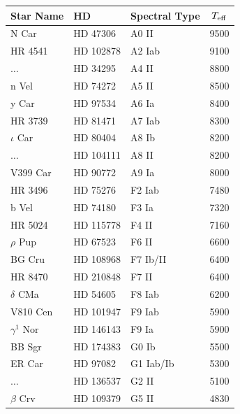 \begin{table}
\begin{center}
\begin{tabular}{lllc}
\hline
Star Name & HD & Spectral Type & $T_{\rm eff}$\\
\hline
\hline
N Car          & HD 47306    &    A0      II &         9500\\
HR 4541        & HD 102878   &    A2     Iab &         9100\\
$\dots$        & HD 34295    &    A4      II &         8800\\
n Vel          & HD 74272    &    A5      II &         8500\\
y Car          &  HD 97534   &    A6      Ia &         8400\\
HR 3739        & HD 81471    &    A7     Iab &         8300\\
$\iota$ Car    & HD 80404    &    A8      Ib &         8200\\
$\dots$        & HD 104111   &    A8      II &         8200\\
V399 Car       & HD 90772    &    A9      Ia &         8000\\
HR 3496        &  HD 75276   &    F2     Iab &         7480\\
b Vel          &  HD 74180   &    F3      Ia &         7320\\
HR 5024        & HD 115778   &    F4      II &         7160\\
$\rho$ Pup     & HD 67523    &    F6      II &         6600\\
BG Cru         & HD 108968   &    F7   Ib/II &         6400\\
HR 8470        & HD 210848   &    F7      II &         6400\\
$\delta$ CMa   &  HD 54605   &    F8     Iab &         6200\\
V810 Cen       & HD 101947   &    F9     Iab &         5900\\
$\gamma^1$ Nor & HD 146143   &    F9      Ia &         5900\\
BB Sgr         & HD 174383   &    G0      Ib &         5500\\
ER Car         &  HD 97082   &    G1  Iab/Ib &         5300\\
$\dots$        & HD 136537   &    G2      II &         5100\\
$\beta$ Crv    & HD 109379   &    G5      II &         4830\\

\end{tabular}
\end{center}
\end{table}
